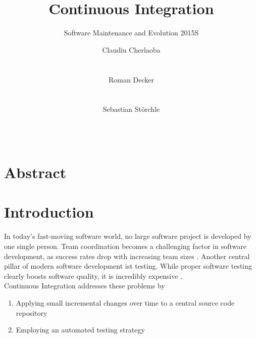 \documentclass{sig-alternate}
\begin{document}
\title{Continuous Integration}
\subtitle{Software Maintenance and Evolution 2015S}



\author{
\alignauthor
Claudiu Cherlaoba\\
       \\
       \\
\alignauthor
Roman Decker\\
       \\
       \\
\alignauthor
Sebastian Störchle\\
       \\
       \\
}

\maketitle

\section{Abstract}

\section{Introduction}

In today's fast-moving software world, no large software project is developed by
one single person. Team coordination becomes a challenging factor in software
development, as success rates drop with increasing team sizes
\cite{ambler:2010}. Another central pillar of modern software development ist
testing. While proper software testing clearly boosts software quality, it is
incredibly expensive \cite{dustin:1999}.\\

Continuous Integration addresses these problems by
\begin{enumerate}[label=(\alph*)]
 \item Applying small incremental changes over time to a central source code
       repository
 \item Employing an automated testing strategy
\end{enumerate}



\end{document}
